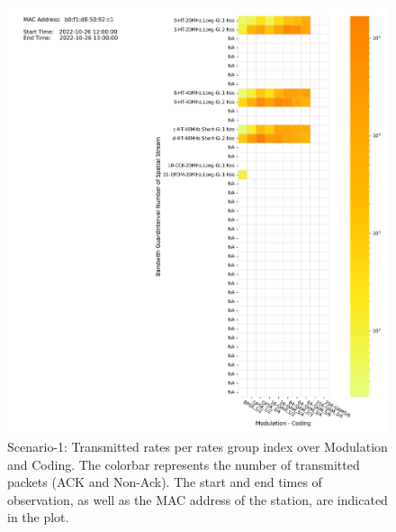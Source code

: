 \begin{figure}[hbt!]
  \centering
  \includegraphics[width=\textwidth]{figures/plots/Scenario-1/G1-attemptmap-b0:f1:d8:50:92:c1-22-1652-351697.png}
  \caption[Transmission Status]{Scenario-1: Transmitted rates per rates group index over Modulation and Coding. The colorbar represents the number of transmitted packets (ACK and Non-Ack). The start and end times of observation, as well as the MAC address of the station, are indicated in the plot.}
  \label{fig:Attempt1}
\end{figure}
\FloatBarrier 


